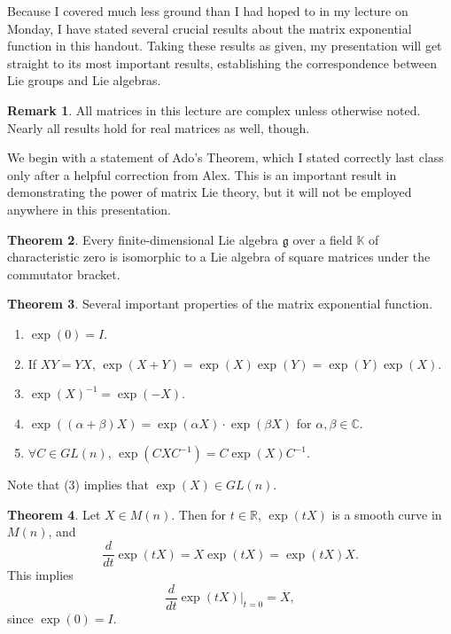 \documentclass[12pt]{article}
\newcommand{\C}{\mathbb{C}}
\newcommand{\R}{\mathbb{R}}
\newcommand{\K}{\mathbb{K}}
\newcommand{\g}{\mathfrak{g}}
\theoremstyle{definition}
\newtheorem{them}{Theorem}
\theoremstyle{definition}
\theoremstyle{definition}
\newtheorem{rmk}[them]{Remark}
\theoremstyle{definition}
\theoremstyle{definition}
\theoremstyle{definition}
\theoremstyle{definition}
\begin{document}
\par{Because I covered much less ground than I had hoped to in my lecture on Monday, I have stated several crucial results about the matrix exponential function in this handout. Taking these results as given, my presentation will get straight to its most important results, establishing the correspondence between Lie groups and Lie algebras.}

\begin{rmk} All matrices in this lecture are
complex unless otherwise noted. Nearly all results
hold for real matrices as well, though.
\end{rmk}

\par{We begin with a statement of Ado’s Theorem, which I stated correctly last class only after a helpful correction from Alex. This is an important result in demonstrating the power of matrix Lie theory, but it will not be employed anywhere in this presentation.}
\begin{them} Every finite-dimensional Lie algebra $\g$
over a field $\K$ of characteristic zero is
isomorphic to a Lie algebra of square matrices under
the commutator bracket.
\end{them}

\begin{them} Several important properties of
the matrix exponential function.
\begin{enumerate}
    \item $\exp(0)= I$.
    \item If $XY = YX$, $\exp(X + Y) = \exp(X)\exp(Y) = \exp(Y)\exp(X)$.
    \item ${\exp(X)}^{-1} = {\exp(-X)}$.
    \item $\exp((\alpha +\beta)X) = \exp(\alpha X)
    \cdot \exp(\beta X)$ for $\alpha, \beta \in
    \C$. 
    \item $\forall C \in GL(n)$, $\exp(CXC^{-1}) = C\exp(X)C^{-1}$.
\end{enumerate}
\end{them}
\par{Note that (3) implies that $\exp(X) \in GL(n)$.}

\begin{them}
Let $X \in M(n)$. Then for $t \in \R$,
$\exp(tX)$ is a smooth curve in
$M(n)$, and 
\[
    \frac{d}{dt} \exp(tX) = X\exp(tX) = \exp(tX)X.
\] This implies
\[
    \frac{d}{dt} \exp(tX) \Big|_{t=0} = X,
\] since $\exp(0) = I$.
\end{them}
\end{document}
